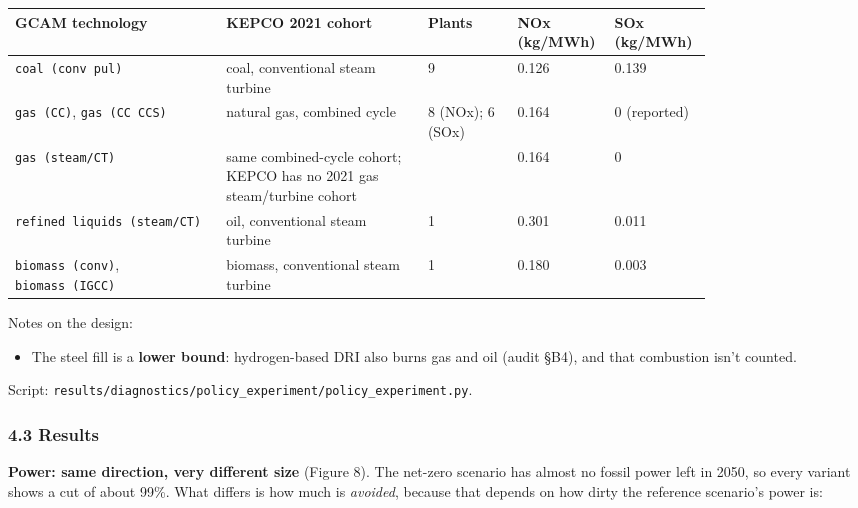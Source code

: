 \begin{longtable}[]{@{}p{0.22\linewidth}p{0.27\linewidth}p{0.12\linewidth}p{0.10\linewidth}p{0.10\linewidth}@{}}
\toprule\noalign{}
GCAM technology & KEPCO 2021 cohort & Plants & NOx (kg/\allowbreak{}MWh) & SOx (kg/\allowbreak{}MWh) \\
\midrule\noalign{}
\endhead
\bottomrule\noalign{}
\endlastfoot
\texttt{coal\ (conv\ pul)} & coal, conventional steam turbine & 9 & 0.126 & 0.139 \\
\texttt{gas\ (CC)}, \texttt{gas\ (CC\ CCS)} & natural gas, combined cycle & 8 (NOx); 6 (SOx) & 0.164 & 0 (reported) \\
\texttt{gas\ (steam/CT)} & same combined-cycle cohort; KEPCO has no 2021 gas steam/turbine cohort & & 0.164 & 0 \\
\texttt{refined\ liquids\ (steam/CT)} & oil, conventional steam turbine & 1 & 0.301 & 0.011 \\
\texttt{biomass\ (conv)}, \texttt{biomass\ (IGCC)} & biomass, conventional steam turbine & 1 & 0.180 & 0.003 \\
\end{longtable}

Notes on the design:

\begin{itemize}
\tightlist
\item
  The
  steel
  fill is
  a
  \textbf{lower
  bound}:
  hydrogen-based
  DRI also
  burns
  gas and
  oil
  (audit
  §B4),
  and that
  combustion
  isn't
  counted.
\end{itemize}

Script:
\texttt{results/\allowbreak{}diagnostics/\allowbreak{}policy\_\allowbreak{}experiment/\allowbreak{}policy\_\allowbreak{}experiment.\allowbreak{}py}.

\hypertarget{results}{%
\subsubsection*{4.3 Results}\label{results}}

\textbf{Power:
same
direction,
very
different
size}
(Figure
8). The
net-zero
scenario
has almost
no fossil
power left
in 2050,
so every
variant
shows a
cut of
about
99\%. What
differs is
how much
is
\emph{avoided},
because
that
depends on
how dirty
the
reference
scenario's
power is:

